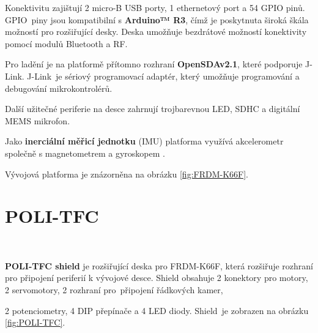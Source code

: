Konektivitu zajištují 2 micro-B USB porty, 1 ethernetový port a 54 GPIO pinů.
GPIO~piny jsou kompatibilní s \textbf{Arduino™ R3}, čímž je poskytnuta široká škála
možností pro rozšiřující desky. Deska umožňuje bezdrátové možností konektivity
pomocí modulů Bluetooth a RF.

Pro ladění je na platformě přítomno rozhraní \textbf{OpenSDAv2.1}, které podporuje
J-Link. J-Link~je sériový programovací adaptér, který umožňuje programování a
debugování mikrokontrolérů.

Další užitečné periferie na desce zahrnují trojbarevnou LED, SDHC a digitální MEMS
mikrofon.

Jako \textbf{inerciální měřicí jednotku} (IMU) platforma využívá akcelerometr
společně s magnetometrem a gyroskopem \cite{frdmk66UserGuide}.

Vývojová platforma je znázorněna na obrázku \ref{fig:FRDM-K66F}.

\section{POLI-TFC}
\label{sec:POLI-TFC}\

\textbf{POLI-TFC shield} je rozšiřující deska pro FRDM-K66F, která rozšiřuje
rozhraní pro připojení periferií k vývojové desce. Shield obsahuje 2 konektory
pro motory, 2 servomotory, 2 rozhraní pro~připojení řádkových kamer,

2 potenciometry, 4 DIP přepínače a 4 LED diody. Shield~je zobrazen na obrázku
\ref{fig:POLI-TFC}.


